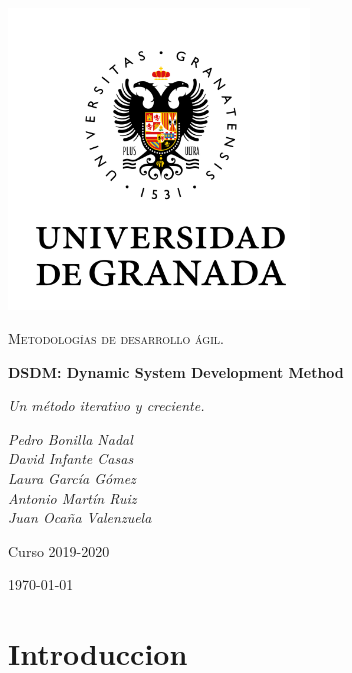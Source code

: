 \documentclass[12pt,a4paper]{article}
\begin{document}
\pgfplotsset{compat=1.16}
\begin{titlepage}
  \centering
  \includegraphics[width=0.6\textwidth]{ugr.png}\par\vspace{1cm}
  {\scshape\large Metodologías de desarrollo ágil. \par} \vspace{1cm}
  {\huge\bfseries DSDM: Dynamic System Development Method \par}
  \vspace{0.4cm}
  {\large\itshape Un método iterativo y creciente.\\}
  \vspace{0.6cm}
  {\large\itshape  Pedro Bonilla Nadal \\ David Infante Casas \\ Laura García Gómez \\ Antonio Martín Ruiz \\ Juan Ocaña Valenzuela  \par} \vspace{1.00cm}
  Curso 2019-2020 \\
  \vfill

  {\large \today\par}
\end{titlepage}

\tableofcontents
\newpage

\setlength{\parskip}{10pt}
\justify

\section{Introduccion}
\end{document}
